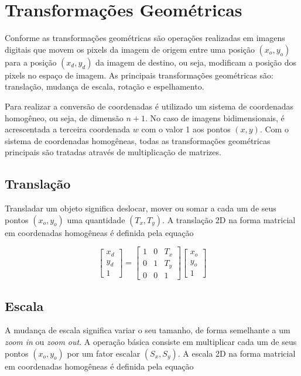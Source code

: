 \documentclass[12pt,oneside,a4paper,english,french,spanish,brazil,]{abntex2}
\begin{document}

\section{Transformações Geométricas}

Conforme \citet{conci:2003} as transformações geométricas são operações realizadas em imagens digitais que movem os pixels da imagem de origem entre uma posição \((x_o,y_o)\) para a posição \((x_d,y_d)\) da imagem de destino, ou seja, modificam a posição dos pixels no espaço de imagem. As principais transformações geométricas são: translação, mudança de escala, rotação e espelhamento.

Para realizar a conversão de coordenadas é utilizado um sistema de coordenadas homogêneo, ou seja, de dimensão \(n+1\). No caso de imagens bidimensionais, é acrescentada a terceira coordenada \(w\) com o valor 1 aos pontos \((x, y)\). Com o sistema de coordenadas homogêneas, todas as transformações geométricas principais são tratadas através de multiplicação de matrizes.

\subsection{Translação}

Transladar um objeto significa deslocar, mover ou somar a cada um de seus pontos \((x_o,y_o)\) uma quantidade \((T_x,T_y)\). A translação 2D na forma matricial em coordenadas homogêneas é definida pela equação

\[
\begin{bmatrix}
x_d\\ 
y_d\\ 
1
\end{bmatrix}
=
\begin{bmatrix}
1 & 0 & T_x\\ 
0 & 1 & T_y\\ 
0 & 0 & 1
\end{bmatrix}
\begin{bmatrix}
x_o\\ 
y_o\\ 
1
\end{bmatrix}
\]

\subsection{Escala}

A mudança de escala significa variar o seu tamanho, de forma semelhante a um \textit{zoom in} ou \textit{zoom out}. A operação básica consiste em multiplicar cada um de seus pontos \((x_o,y_o)\) por um fator escalar \((S_x,S_y)\). A escala 2D na forma matricial em coordenadas homogêneas é definida pela equação
\end{document}
